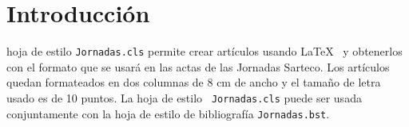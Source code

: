 \section{Introducción}
 hoja de estilo {\tt Jornadas.cls} permite crear artículos usando
\LaTeX\ \cite{LaTeX} y obtenerlos con el formato que se usará en las actas de
las Jornadas Sarteco. Los artículos quedan formateados en dos columnas de 8 cm
de ancho y el tamaño de letra usado es de 10 puntos. La hoja de estilo {\tt
Jornadas.cls} puede ser usada conjuntamente con la hoja de estilo de
bibliografía {\tt Jornadas.bst}. 
